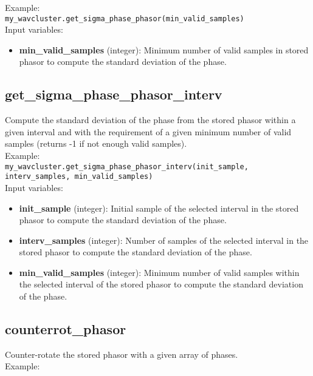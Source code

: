 Example:\\

\texttt{my\_wavcluster.get\_sigma\_phase\_phasor(min\_valid\_samples)}\\

Input variables:
\begin{itemize}
\item {\bf min\_valid\_samples} (integer): Minimum number of valid samples in stored phasor to compute the standard deviation of the phase.
\end{itemize}


\subsection{get\_sigma\_phase\_phasor\_interv}

Compute the standard deviation of the phase from the stored phasor within a given interval and with the requirement of a given minimum number of valid samples (returns -1 if not enough valid samples).\\

Example:\\

\texttt{my\_wavcluster.get\_sigma\_phase\_phasor\_interv(init\_sample, interv\_samples, min\_valid\_samples)}\\

Input variables:
\begin{itemize}
\item {\bf init\_sample} (integer): Initial sample of the selected interval in the stored phasor to compute the standard deviation of the phase.
\item {\bf interv\_samples} (integer): Number of samples of the selected interval in the stored phasor to compute the standard deviation of the phase.
\item {\bf min\_valid\_samples} (integer): Minimum number of valid samples within the selected interval of the stored phasor to compute the standard deviation of the phase.
\end{itemize}


\subsection{counterrot\_phasor}

Counter-rotate the stored phasor with a given array of phases.\\

Example:\\

